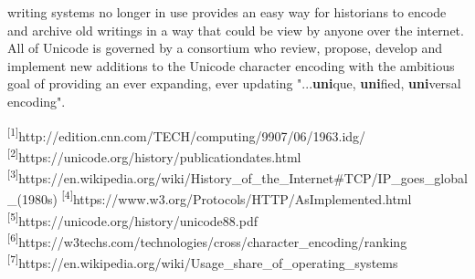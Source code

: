\documentclass{article}
\begin{document}
\begin{multicols*}{2}
\begin{flushleft}
writing systems no longer in use provides an easy way for historians to encode and archive old writings in a way that could be view by anyone over the internet. All of Unicode is governed by a consortium who review, propose, develop and implement new additions to the Unicode character encoding with the ambitious goal of providing an ever expanding, ever updating "...\textbf{uni}que, \textbf{uni}fied, \textbf{uni}versal encoding".\end{flushleft}

\begin{flushleft}
\textsuperscript{[1]}http://edition.cnn.com/TECH/computing/9907/06/1963.idg/
\newline\textsuperscript{[2]}https://unicode.org/history/publicationdates.html
\newline\textsuperscript{[3]}https://en.wikipedia.org/wiki/History\_of\_the\_Internet\#TCP/IP\_goes\_global\_(1980s)
\newline\textsuperscript{[4]}https://www.w3.org/Protocols/HTTP/AsImplemented.html
\newline\textsuperscript{[5]}https://unicode.org/history/unicode88.pdf
\newline\textsuperscript{[6]}https://w3techs.com/technologies/cross/character\_encoding/ranking
\newline\textsuperscript{[7]}https://en.wikipedia.org/wiki/Usage\_share\_of\_operating\_systems
\end{flushleft}
\end{multicols*}
\end{document}
